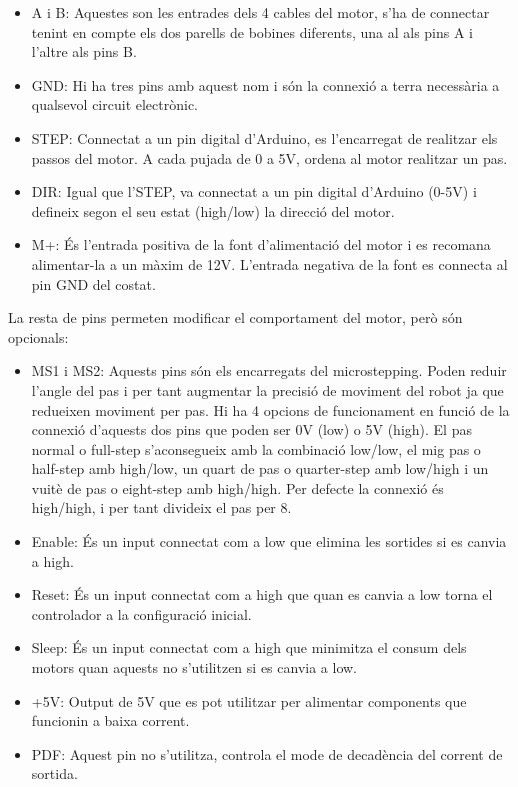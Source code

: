 \begin{itemize}
	
	\item	A i B: Aquestes son les entrades dels 4 cables del motor, s'ha de connectar tenint en compte els dos parells de bobines diferents, una al als pins A i l'altre als pins B. 
	
	\item GND: Hi ha tres pins amb aquest nom i són la connexió a terra necessària a qualsevol circuit electrònic.
	
	\item STEP: Connectat a un pin digital d'Arduino, es l'encarregat de realitzar els passos del motor. A cada pujada de 0 a 5V, ordena al motor realitzar un pas. 
	
	\item DIR: Igual que l'STEP, va connectat a un pin digital d'Arduino (0-5V) i defineix segon el seu estat (high/low) la direcció del motor.
	
	\item M+: És l'entrada positiva de la font d'alimentació del motor i es recomana alimentar-la a un màxim de 12V. L'entrada negativa de la font es connecta al pin GND del costat.
	
\end{itemize}

La resta de pins permeten modificar el comportament del motor, però són opcionals:

\begin{itemize}
	
	\item MS1 i MS2: Aquests pins són els encarregats del microstepping. Poden reduir l'angle del pas i per tant augmentar la precisió de moviment del robot ja que redueixen moviment per pas. Hi ha 4 opcions de funcionament en funció de la connexió d'aquests dos pins que poden ser 0V (low) o 5V (high). El pas normal o full-step s'aconsegueix amb la combinació low/low, el mig pas o half-step amb high/low, un quart de pas o quarter-step amb low/high i un vuitè de pas o eight-step amb high/high. Per defecte la connexió és high/high, i per tant divideix el pas per 8. 
	
	\item Enable: És un input connectat com a low que elimina les sortides si es canvia a high.
	
	\item Reset: És un input connectat com a high que quan es canvia a low torna el controlador a la configuració inicial. 
	
	\item Sleep: És un input connectat com a high que minimitza el consum dels motors quan aquests no s'utilitzen si es canvia a low.
	
	\item +5V: Output de 5V que es pot utilitzar per alimentar components que funcionin a baixa corrent. 
	
	\item PDF: Aquest pin no s'utilitza, controla el mode de decadència del corrent de sortida.
	
\end{itemize}


